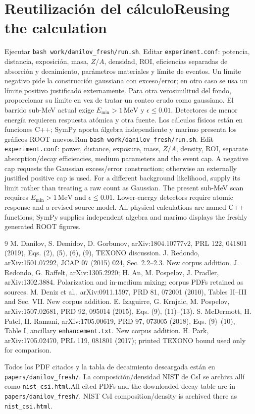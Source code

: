 \documentclass[11pt]{article}
\newcommand{\B}[2]{\ifspanish#2\else#1\fi}
\begin{document}
\section{\B{Reusing the calculation}{Reutilización del cálculo}}
\B{Run \texttt{bash work/danilov\_fresh/run.sh}. Edit \texttt{experiment.conf}: power, distance, exposure, mass, $Z/A$, density, ROI, separate absorption/decay efficiencies, medium parameters and the event cap. A negative cap requests the Gaussian excess/error construction; otherwise an externally justified positive cap is used. For a different background likelihood, supply its limit rather than treating a raw count as Gaussian. The present sub-MeV scan requires $E_{\min}>1\,\mathrm{MeV}$ and $\epsilon\le0.01$. Lower-energy detectors require atomic response and a revised source model. All physical calculations are named C++ functions; SymPy supplies independent algebra and marimo displays the freshly generated ROOT figures.}
{Ejecutar \texttt{bash work/danilov\_fresh/run.sh}. Editar \texttt{experiment.conf}: potencia, distancia, exposición, masa, $Z/A$, densidad, ROI, eficiencias separadas de absorción y decaimiento, parámetros materiales y límite de eventos. Un límite negativo pide la construcción gaussiana con exceso/error; en otro caso se usa un límite positivo justificado externamente. Para otra verosimilitud del fondo, proporcionar su límite en vez de tratar un conteo crudo como gaussiano. El barrido sub-MeV actual exige $E_{\min}>1\,\mathrm{MeV}$ y $\epsilon\le0.01$. Detectores de menor energía requieren respuesta atómica y otra fuente. Los cálculos físicos están en funciones C++; SymPy aporta álgebra independiente y marimo presenta los gráficos ROOT nuevos.}

\begin{thebibliography}{9}
 M. Danilov, S. Demidov, D. Gorbunov, arXiv:1804.10777v2, PRL 122, 041801 (2019), Eqs. (2), (5), (6), (9), TEXONO discussion.
 J. Redondo, arXiv:1501.07292, JCAP 07 (2015) 024, Sec. 2.2--2.3. New corpus addition.
 J. Redondo, G. Raffelt, arXiv:1305.2920; H. An, M. Pospelov, J. Pradler, arXiv:1302.3884. Polarization and in-medium mixing; corpus PDFs retained as sources.
 M. Deniz et al., arXiv:0911.1597, PRD 81, 072001 (2010), Tables II--III and Sec. VII. New corpus addition.
 E. Izaguirre, G. Krnjaic, M. Pospelov, arXiv:1507.02681, PRD 92, 095014 (2015), Eqs. (9), (11)--(13).
 S. McDermott, H. Patel, H. Ramani, arXiv:1705.00619, PRD 97, 073005 (2018), Eqs. (9)--(10), Table I, ancillary \texttt{enhancement.txt}. New corpus addition.
 H. Park, arXiv:1705.02470, PRL 119, 081801 (2017); printed TEXONO bound used only for comparison.
\end{thebibliography}
\B{All cited PDFs and the downloaded decay table are in \texttt{papers/danilov\_fresh/}. NIST CsI composition/density is archived there as \texttt{nist\_csi.html}.}{Todos los PDF citados y la tabla de decaimiento descargada están en \texttt{papers/danilov\_fresh/}. La composición/densidad NIST de CsI se archiva allí como \texttt{nist\_csi.html}.}
\end{document}

